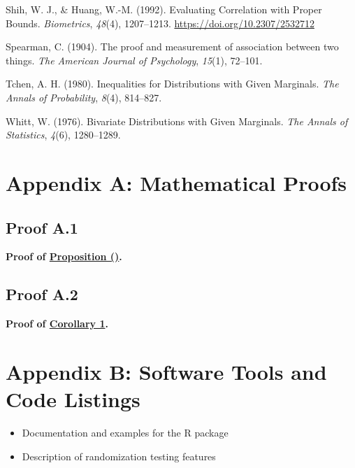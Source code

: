 \documentclass[
  12pt,
]{article}
\newlength{\cslhangindent}
\newenvironment{CSLReferences}[2] %
 {\begin{list}{}{%
  \setlength{\itemindent}{0pt}
  \setlength{\leftmargin}{0pt}
  \setlength{\parsep}{0pt}
  \ifodd #1
   \setlength{\leftmargin}{\cslhangindent}
   \setlength{\itemindent}{-1\cslhangindent}
  \fi
  \setlength{\itemsep}{#2\baselineskip}}}
 {\end{list}}
\providecommand{\tightlist}{%
  \setlength{\itemsep}{0pt}\setlength{\parskip}{0pt}}
\theoremstyle{plain}
\theoremstyle{definition}
\theoremstyle{remark}
\begin{document}
\begin{CSLReferences}{1}{0}
Shih, W. J., \& Huang, W.-M. (1992). Evaluating {Correlation} with
{Proper Bounds}. \emph{Biometrics}, \emph{48}(4), 1207--1213.
\url{https://doi.org/10.2307/2532712}

Spearman, C. (1904). The proof and measurement of association between
two things. \emph{The American Journal of Psychology}, \emph{15}(1),
72--101.

Tchen, A. H. (1980). Inequalities for {Distributions} with {Given
Marginals}. \emph{The Annals of Probability}, \emph{8}(4), 814--827.

Whitt, W. (1976). Bivariate {Distributions} with {Given Marginals}.
\emph{The Annals of Statistics}, \emph{4}(6), 1280--1289.

\end{CSLReferences}

\newpage

\appendix

\section{Appendix A: Mathematical
Proofs}\label{appendix-a-mathematical-proofs}

\subsection{Proof A.1}\label{proof-max-product}

\textbf{Proof of \hyperref[prop-max-product]{Proposition
()}.}

\subsection{Proof A.2}\label{proof-cor-min}

\textbf{Proof of \hyperref[cor-min]{Corollary 1}.}

\section{Appendix B: Software Tools and Code
Listings}\label{appendix-b-software-tools-and-code-listings}

\begin{itemize}
\tightlist
\item
  Documentation and examples for the R package\\
\item
  Description of randomization testing features
\end{itemize}
\end{document}
